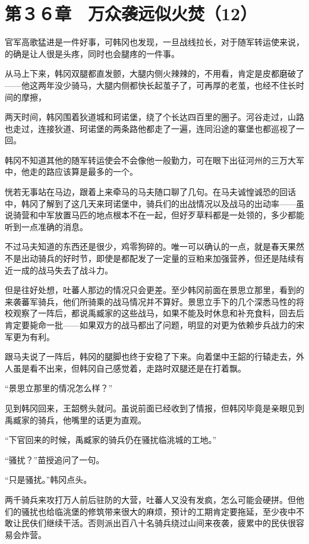 \section{第３６章　万众袭远似火焚（12）}

官军高歌猛进是一件好事，可韩冈也发现，一旦战线拉长，对于随军转运使来说，的确是让人很是头疼，同时也会腿疼的一件事。

从马上下来，韩冈双腿都直发颤，大腿内侧火辣辣的，不用看，肯定是皮都磨破了——他这两年没少骑马，大腿内侧都快长起茧子了，可再厚的老茧，也经不住长时间的摩擦，

两天时间，韩冈围着狄道城和珂诺堡，绕了个长达四百里的圈子。河谷走过，山路也走过，连接狄道、珂诺堡的两条路他都走了一遍，连同沿途的寨堡也都巡视了一回。

韩冈不知道其他的随军转运使会不会像他一般勤力，可在眼下出征河州的三万大军中，他走的路应该算是最多的一个。

恍若无事站在马边，跟着上来牵马的马夫随口聊了几句。在马夫诚惶诚恐的回话中，韩冈了解到了这几天来珂诺堡中，骑兵们的出战情况以及战马的出动率——虽说骑营和中军放置马匹的地点根本不在一起，但好歹草料都是一处领的，多少都能听到一点准确的消息。

不过马夫知道的东西还是很少，鸡零狗碎的。唯一可以确认的一点，就是春天果然不是出动骑兵的好时节，即使是都配发了一定量的豆粕来加强营养，但还是陆续有近一成的战马失去了战斗力。

但是往好处想，吐蕃人那边的情况只会更差。至少韩冈前面在景思立那里，看到的来袭蕃军骑兵，他们所骑乘的战马情况并不算好。景思立手下的几个深悉马性的将校观察了一阵后，都说禹臧家的这些战马，如果不能及时休息和补充食料，回去后肯定要毙命一批——如果双方的战马都出了问题，明显的对更为依赖步兵战力的宋军更为有利。

跟马夫说了一阵后，韩冈的腿脚也终于安稳了下来。向着堡中王韶的行辕走去，外人虽是看不出来，但韩冈自己感觉着，走路时双腿还是在打着飘。

“景思立那里的情况怎么样？”

见到韩冈回来，王韶劈头就问。虽说前面已经收到了情报，但韩冈毕竟是亲眼见到禹臧家的骑兵，他嘴里的话更为直观。

“下官回来的时候，禹臧家的骑兵仍在骚扰临洮城的工地。”

“骚扰？”苗授追问了一句。

“只是骚扰。”韩冈点头。

两千骑兵来攻打万人前后驻防的大营，吐蕃人又没有发疯，怎么可能会硬拼。但他们的骚扰也给临洮堡的修筑带来很大的麻烦，预计的工期肯定要拖延，至少夜中不敢让民伕们继续干活。否则派出百八十名骑兵绕过山间来夜袭，疲累中的民伕很容易会炸营。


